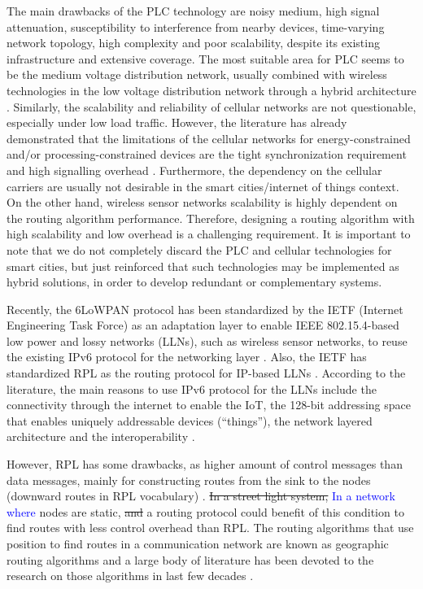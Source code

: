 \documentclass[final,authoryear,3p,twocolumn]{elsarticle}
\newcommand{\rev}{\textcolor{blue}}
\begin{document}
The main drawbacks of the PLC technology are noisy medium, high signal attenuation, susceptibility to interference from nearby devices, time-varying network topology, high complexity and poor scalability, despite its existing infrastructure and extensive coverage. The most suitable area for PLC seems to be the medium voltage distribution network, usually combined with wireless technologies in the low voltage distribution network through a hybrid architecture \citep{PLC_drawbacks}. Similarly, the scalability and reliability of cellular networks are not questionable, especially under low load traffic. However, the literature has already demonstrated that the limitations of the cellular networks for energy-constrained and/or processing-constrained devices are the tight synchronization requirement and high signalling overhead \citep{celullar_iot}. Furthermore, the dependency on the cellular carriers are usually not desirable in the smart cities/internet of things context. On the other hand, wireless sensor networks scalability is highly dependent on the routing algorithm performance. Therefore, designing a routing algorithm with high scalability and low overhead is a challenging requirement. It is important to note that we do not completely discard the PLC and cellular technologies for smart cities, but just reinforced that such technologies may be implemented as hybrid solutions, in order to develop redundant or complementary systems.

Recently, the 6LoWPAN protocol has been standardized by the IETF (Internet Engineering Task Force) as an adaptation layer to enable IEEE 802.15.4-based low power and lossy networks (LLNs), such as wireless sensor networks, to reuse the existing IPv6 protocol for the networking layer \citep{RFC4944}. Also, the IETF has standardized RPL as the routing protocol for IP-based LLNs \citep{RFC6550}. According to the literature, the main reasons to use IPv6 protocol for the LLNs include the connectivity through the internet to enable the IoT, the 128-bit addressing space that enables uniquely addressable devices (``things''), the network layered architecture and the interoperability \citep{IPv6_LLN_2010, IPv6_LLN_2011, Smart_City_IOT_2014b}.

However, RPL has some drawbacks, as higher amount of control messages than data messages, mainly for constructing routes from the sink to the nodes (downward routes in RPL vocabulary) \citep{Heurtefeux_RPL_2013,P2P_analysis_2010,P2P-RPL_2011}. \sout{In a street light system,} \rev{In a network where} nodes are static, \sout{and} a routing protocol could benefit of this condition to find routes with less control overhead than RPL. The routing algorithms that use position to find routes in a communication network are known as geographic routing algorithms and a large body of literature has been devoted to the research on those algorithms in last few decades \citep{Karp_GPSR_2000, Position_Based_Routing_Ad_Hoc_2001, On_Optimal_Geographic_Routing_2007, Denardin2011}.
\end{document}
